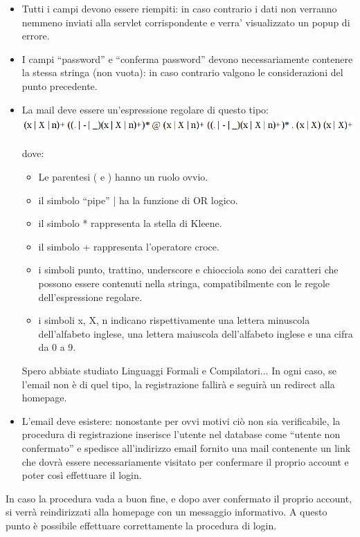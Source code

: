 \documentclass[a4paper,12pt]{article}
\begin{document}
\begin{itemize}
 \item Tutti i campi devono essere riempiti: in caso contrario i dati non verranno nemmeno inviati alla servlet corrispondente e verra' visualizzato un popup di errore.
 \item I campi ``password'' e ``conferma password'' devono necessariamente contenere la stessa stringa (non vuota): in caso contrario valgono le considerazioni del punto precedente.
 \item La mail deve essere un'espressione regolare di questo tipo: \\
 
 \includegraphics[scale=0.6]{email} 
 
 dove:
 
 \begin{itemize}
  \item Le parentesi ( e ) hanno un ruolo ovvio.
  \item il simbolo ``pipe'' | ha la funzione di OR logico.
  \item il simbolo * rappresenta la stella di Kleene.
  \item il simbolo + rappresenta l'operatore croce.
  \item i simboli punto, trattino, underscore e chiocciola sono dei caratteri che possono essere contenuti nella stringa, compatibilmente con le regole dell'espressione regolare.
  \item i simboli x, X, n indicano rispettivamente una lettera minuscola dell'alfabeto inglese, una lettera maiuscola dell'alfabeto inglese e una cifra da 0 a 9.
 \end{itemize}

 
 Spero abbiate studiato Linguaggi Formali e Compilatori... In ogni caso, se l'email non è di quel tipo, la registrazione fallirà e seguirà un redirect alla homepage.
 \item L'email deve esistere: nonostante per ovvi motivi ciò non sia verificabile, la procedura di registrazione inserisce l'utente nel database come ``utente non confermato'' e
 spedisce all'indirizzo email fornito una mail contenente un link che dovrà essere necessariamente visitato per confermare il proprio account e poter così effettuare il login.
\end{itemize}

In caso la procedura vada a buon fine, e dopo aver confermato il proprio account, si verrà reindirizzati alla homepage con un messaggio informativo. A questo punto è possibile
effettuare correttamente la procedura di login.
\end{document}
